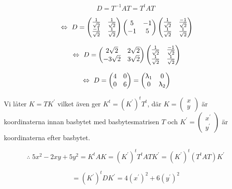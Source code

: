\documentclass{article}
\begin{document}
$$
D=T^{-1}AT=T^{t}AT
$$

$$
\ \Leftrightarrow \ 
D=
\begin{pmatrix}
    \frac{1}{\sqrt{2}} & \frac{1}{\sqrt{2}} \\
    \frac{-1}{\sqrt{2}} & \frac{1}{\sqrt{2}}
\end{pmatrix}
\begin{pmatrix}
    5 & -1 \\
    -1 & 5 
\end{pmatrix}
\begin{pmatrix}
    \frac{1}{\sqrt{2}} & \frac{-1}{\sqrt{2}} \\
    \frac{1}{\sqrt{2}} & \frac{1}{\sqrt{2}}
\end{pmatrix}
$$

$$
\ \Leftrightarrow \ 
D=
\begin{pmatrix}
    2\sqrt{2} & 2\sqrt{2} \\
    -3\sqrt{2} & 3\sqrt{2} \\
\end{pmatrix}
\begin{pmatrix}
    \frac{1}{\sqrt{2}} & \frac{-1}{\sqrt{2}} \\
    \frac{1}{\sqrt{2}} & \frac{1}{\sqrt{2}}
\end{pmatrix}
$$

$$
\ \Leftrightarrow \ 
D=
\begin{pmatrix}
    4 & 0 \\
    0 & 6
\end{pmatrix}
= 
\begin{pmatrix}
    \uplambda_{1} & 0 \\
    0 & \uplambda_{2}
\end{pmatrix}
$$

\newpage

Vi låter $K=TK^{'}$ vilket även ger $K^{t}=(K^{'})^{t}T^{t}$, där $K=\begin{pmatrix} x \\ y \end{pmatrix}$ är koordinaterna innan basbytet med basbytesmatrisen $T$ och $K^{'}=\begin{pmatrix} x^{'} \\ y^{'} \end{pmatrix}$ är koordinaterna efter basbytet.

\vskip 0.3cm

$$
\therefore
\;
5x^2-2xy+5y^2=
K^{t}AK=
(K^{'})^{t}T^{t}ATK^{'}=
(K^{'})^{t}(T^{t}AT)K^{'}
$$

$$
=
(K^{'})^{t}DK^{'}=
4(x^{'})^2+6(y^{'})^2
$$
\end{document}
